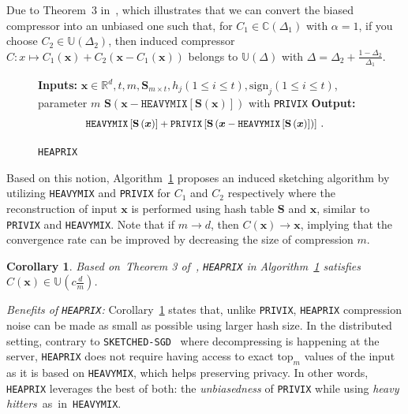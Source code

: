 \documentclass[11pt]{article}
\newtheorem{corollary}{Corollary}
\newcommand*{\Resize}[2]{\resizebox{#1}{!}{$#2$}}%
\begin{document}
Due to Theorem~$3$ in~\cite{horvath2020better}, which illustrates that we can convert the biased compressor into an unbiased one such that, for $C_1\in \mathbb{C}(\Delta_1)$ with $\alpha=1$, if you choose $C_2\in \mathbb{U}(\Delta_2)$, then induced compressor $C: x \mapsto C_1(\mathbf{x})+C_2\left(\mathbf{x}-C_1\left(\mathbf{x}\right)\right)$ belongs to $\mathbb{U}(\Delta)$ with $\Delta=\Delta_2+\frac{1-\Delta_2}{\Delta_1}$. 
\begin{figure}\vspace{-0.2in}
\begin{minipage}{\linewidth}
\begin{algorithm}[H]
\caption{\texttt{HEAPRIX} }\label{alg:heaprix}
\begin{algorithmic}[1]
\STATE \textbf{Inputs:} $\boldsymbol{x}\in\mathbb{R}^{d}, t, m, \mathbf{S}_{m\times t}, h_j (1\leq i\leq t), \text{sign}_j (1\leq i\leq t)$, parameter $m$
 $\mathbf{S}\left(\boldsymbol{x} - \texttt{HEAVYMIX}[\mathbf{S}(\boldsymbol{x})]\right)$ with \texttt{PRIVIX} 
\STATE \textbf{Output:}
\vspace{- 0.1cm}
\[ \Resize{7.4cm}{\texttt{HEAVYMIX}\left[\mathbf{S}\left(\boldsymbol{x}\right)\right]+\texttt{PRIVIX}\left[\mathbf{S}\left(\boldsymbol{x}-\texttt{HEAVYMIX}\left[\mathbf{S}\left(\boldsymbol{x}\right)\right]\right)\right]}\ .\]
\end{algorithmic}
\end{algorithm}
\vspace{-0.1in}
\end{minipage}\end{figure}
Based on this notion, Algorithm~\ref{alg:heaprix} proposes an induced sketching algorithm by utilizing \texttt{HEAVYMIX} and \texttt{PRIVIX} for $C_1$ and $C_2$ respectively where the reconstruction of input $\mathbf{x}$ is performed using hash table $\mathbf{S}$ and $\mathbf{x}$, similar to \texttt{PRIVIX} and \texttt{HEAVYMIX}.
Note that if $m\rightarrow d$, then $C(\boldsymbol{x})\rightarrow \boldsymbol{x}$, implying that the convergence rate  can be improved by decreasing the size of compression $m$. 
\begin{corollary}\label{cor:small}
Based on~Theorem 3 of~\citep{horvath2020better}, \texttt{HEAPRIX} in Algorithm~\ref{alg:heaprix} satisfies $C(\boldsymbol{x})\in \mathbb{U}(c \frac{d}{m})$. 
\end{corollary}
\textit{Benefits of \texttt{HEAPRIX}:} Corollary~\ref{cor:small} states that, unlike \texttt{PRIVIX}, \texttt{HEAPRIX} compression noise can be made as small as possible using larger hash size. 
In the distributed setting, 
contrary to \texttt{SKETCHED-SGD}~\cite{ivkin2019communication} where decompressing is happening at the server, \texttt{HEAPRIX} does not require having access to exact $\text{top}_m$ values of the input as it is based on \texttt{HEAVYMIX}, which helps preserving privacy.
In other words, \texttt{HEAPRIX} leverages the best of both: the \emph{unbiasedness} of \texttt{PRIVIX} while using \emph{heavy hitters}~as~in~\texttt{HEAVYMIX}.
\end{document}
